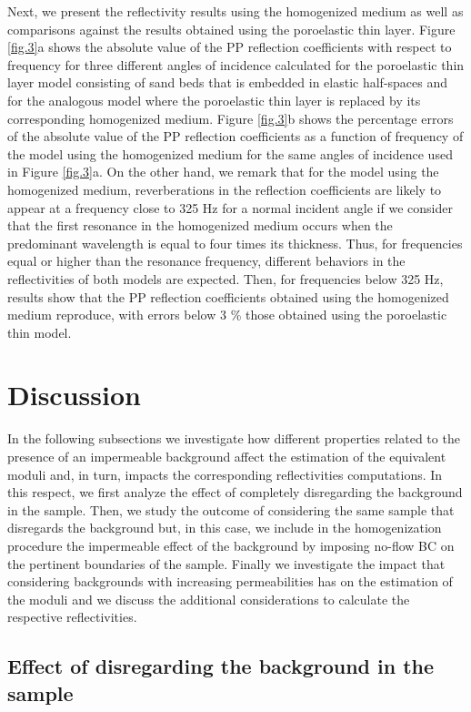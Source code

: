 \documentclass[draft]{agujournal2019}
\begin{document}
Next, we present the reflectivity results using the homogenized medium as well as comparisons against the results obtained using the poroelastic thin layer. 
Figure \ref{fig.3}a shows the absolute value of the PP reflection coefficients with respect to frequency for three different angles of incidence calculated for the poroelastic thin layer model consisting of sand beds that is embedded in elastic half-spaces and for the analogous model where the poroelastic thin layer is replaced by its corresponding homogenized medium.  
Figure \ref{fig.3}b shows the percentage errors of the absolute value of the PP reflection coefficients as a function of frequency of the model using the homogenized medium for the same angles of incidence used in Figure \ref{fig.3}a. 
On the other hand, we remark that for the model using the homogenized medium, reverberations in the reflection coefficients are likely to appear at a frequency close to 325 Hz for a normal incident angle if we consider that the first resonance in the homogenized medium occurs when the predominant wavelength is  equal to four times its thickness. Thus, for frequencies equal or higher than the resonance frequency, different behaviors in the reflectivities of both models are expected. Then, for frequencies below 325 Hz, results show that the PP reflection coefficients obtained using the homogenized medium reproduce, with errors below 3 \% those obtained using the poroelastic thin model. 

\section{Discussion}
In the following subsections we investigate how different properties related to the presence of an impermeable background affect the estimation of the equivalent moduli and, in turn, impacts the corresponding reflectivities computations. In this respect, we first analyze the effect of completely disregarding the background in the sample. Then, we study the outcome of considering the same sample that disregards the background but, in this case, we include in the homogenization procedure the impermeable effect of the background by imposing no-flow BC on the pertinent boundaries of the sample. Finally we investigate the impact that considering backgrounds with increasing permeabilities has on the estimation of the moduli and we discuss the additional considerations to calculate the respective reflectivities.

\subsection{Effect of disregarding the background in the sample}
\end{document}
